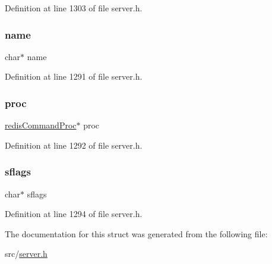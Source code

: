 Definition at line 1303 of file server.\+h.

\mbox{\label{structredis_command_a5ac083a645d964373f022d03df4849c8}} 
\subsubsection{\texorpdfstring{name}{name}}
{\footnotesize\ttfamily char$\ast$ name}



Definition at line 1291 of file server.\+h.

\mbox{\label{structredis_command_a90feddf92dfbfdf42f3a4165c996f6f0}} 
\subsubsection{\texorpdfstring{proc}{proc}}
{\footnotesize\ttfamily \hyperlink{server_8h_a1b31bc58ae4df59cf0b0506c925d342e}{redis\+Command\+Proc}$\ast$ proc}



Definition at line 1292 of file server.\+h.

\mbox{\label{structredis_command_abb4214e4b2dadd9f73384b61c6f13bee}} 
\subsubsection{\texorpdfstring{sflags}{sflags}}
{\footnotesize\ttfamily char$\ast$ sflags}



Definition at line 1294 of file server.\+h.



The documentation for this struct was generated from the following file\+:\begin{DoxyCompactItemize}
\item 
src/\hyperlink{server_8h}{server.\+h}\end{DoxyCompactItemize}
